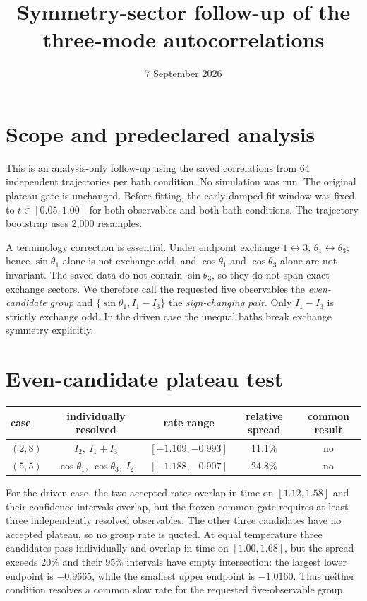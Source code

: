 \documentclass[11pt]{article}
\title{Symmetry-sector follow-up of the three-mode autocorrelations}
\author{}
\date{7 September 2026}
\begin{document}
\maketitle

\section*{Scope and predeclared analysis}
This is an analysis-only follow-up using the saved correlations from 64
independent trajectories per bath condition.  No simulation was run.  The
original plateau gate is unchanged.  Before fitting, the early damped-fit
window was fixed to $t\in[0.05,1.00]$ for both observables and both bath
conditions.  The trajectory bootstrap uses 2,000 resamples.

A terminology correction is essential. Under endpoint exchange
$1\leftrightarrow3$, $\theta_1\leftrightarrow\theta_3$; hence
$\sin\theta_1$ alone is not exchange odd, and $\cos\theta_1$ and
$\cos\theta_3$ alone are not invariant. The saved data do not contain
$\sin\theta_3$, so they do not span exact exchange sectors. We therefore call
the requested five observables the \emph{even-candidate group} and
$\{\sin\theta_1,I_1-I_3\}$ the \emph{sign-changing pair}. Only $I_1-I_3$ is
strictly exchange odd. In the driven case the unequal baths break exchange
symmetry explicitly.

\section*{Even-candidate plateau test}
\begin{table}[h]
\centering\small
\begin{tabular}{lcccc}
\toprule
case & individually resolved & rate range & relative spread & common result\\
\midrule
$(2,8)$ & $I_2,\ I_1+I_3$ & $[-1.109,-0.993]$ & 11.1\% & no\\
$(5,5)$ & $\cos\theta_1,\ \cos\theta_3,\ I_2$ & $[-1.188,-0.907]$ & 24.8\% & no\\
\bottomrule
\end{tabular}
\end{table}

For the driven case, the two accepted rates overlap in time on
$[1.12,1.58]$ and their confidence intervals overlap, but the frozen common
gate requires at least three independently resolved observables. The other
three candidates have no accepted plateau, so no group rate is quoted. At
equal temperature three candidates pass individually and overlap in time on
$[1.00,1.68]$, but the spread exceeds 20\% and their 95\% intervals have empty
intersection: the largest lower endpoint is $-0.9665$, while the smallest
upper endpoint is $-1.0160$. Thus neither condition resolves a common slow
rate for the requested five-observable group.
\end{document}

